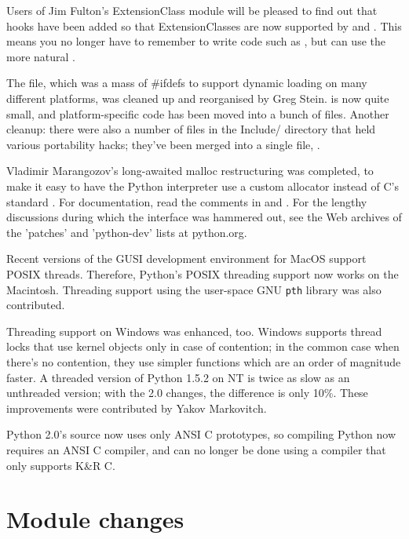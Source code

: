 \documentclass{howto}
\begin{document}
Users of Jim Fulton's ExtensionClass module will be pleased to find
out that hooks have been added so that ExtensionClasses are now
supported by  and .
This means you no longer have to remember to write code such as
, but can use the more natural
.

The  file, which was a mass of \#ifdefs to
support dynamic loading on many different platforms, was cleaned up
and reorganised by Greg Stein.   is now quite small,
and platform-specific code has been moved into a bunch of
 files.  Another cleanup: there were also a
number of  files in the Include/ directory that held
various portability hacks; they've been merged into a single file,
.

Vladimir Marangozov's long-awaited malloc restructuring was completed,
to make it easy to have the Python interpreter use a custom allocator
instead of C's standard .  For documentation, read
the comments in  and
.  For the lengthy discussions during which
the interface was hammered out, see the Web archives of the 'patches'
and 'python-dev' lists at python.org.

Recent versions of the GUSI development environment for MacOS support
POSIX threads.  Therefore, Python's POSIX threading support now works
on the Macintosh.  Threading support using the user-space GNU \texttt{pth}
library was also contributed.

Threading support on Windows was enhanced, too.  Windows supports
thread locks that use kernel objects only in case of contention; in
the common case when there's no contention, they use simpler functions
which are an order of magnitude faster.  A threaded version of Python
1.5.2 on NT is twice as slow as an unthreaded version; with the 2.0
changes, the difference is only 10\%.  These improvements were
contributed by Yakov Markovitch.

Python 2.0's source now uses only ANSI C prototypes, so compiling Python now
requires an ANSI C compiler, and can no longer be done using a compiler that
only supports K\&R C.  

\section{Module changes}
\end{document}
